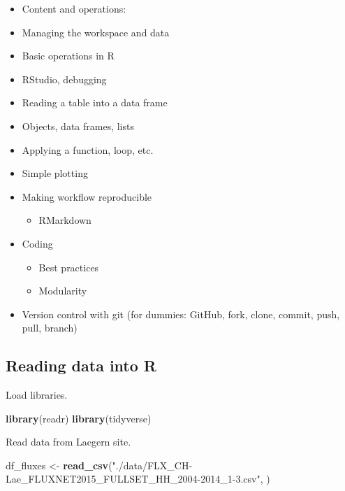 \documentclass[]{book}
\newenvironment{Shaded}{\begin{snugshade}}{\end{snugshade}}
\newcommand{\KeywordTok}[1]{\textcolor[rgb]{0.13,0.29,0.53}{\textbf{#1}}}
\newcommand{\NormalTok}[1]{#1}
\newcommand{\StringTok}[1]{\textcolor[rgb]{0.31,0.60,0.02}{#1}}
\providecommand{\tightlist}{%
  \setlength{\itemsep}{0pt}\setlength{\parskip}{0pt}}
\begin{document}
\begin{itemize}
\tightlist
\item
  Content and operations:
\item
  Managing the workspace and data
\item
  Basic operations in R
\item
  RStudio, debugging
\item
  Reading a table into a data frame
\item
  Objects, data frames, lists
\item
  Applying a function, loop, etc.
\item
  Simple plotting
\item
  Making workflow reproducible

  \begin{itemize}
  \tightlist
  \item
    RMarkdown
  \end{itemize}
\item
  Coding

  \begin{itemize}
  \tightlist
  \item
    Best practices
  \item
    Modularity
  \end{itemize}
\item
  Version control with git (for dummies: GitHub, fork, clone, commit, push, pull, branch)
\end{itemize}

\hypertarget{reading-data-into-r}{%
\subsection{Reading data into R}\label{reading-data-into-r}}

Load libraries.

\begin{Shaded}
\begin{Highlighting}[]
\KeywordTok{library}\NormalTok{(readr)}
\KeywordTok{library}\NormalTok{(tidyverse)}
\end{Highlighting}
\end{Shaded}

Read data from Laegern site.

\begin{Shaded}
\begin{Highlighting}[]
\NormalTok{df_fluxes <-}\StringTok{ }\KeywordTok{read_csv}\NormalTok{(}\StringTok{"./data/FLX_CH-Lae_FLUXNET2015_FULLSET_HH_2004-2014_1-3.csv"}\NormalTok{, ) }
\end{Highlighting}
\end{Shaded}
\end{document}
